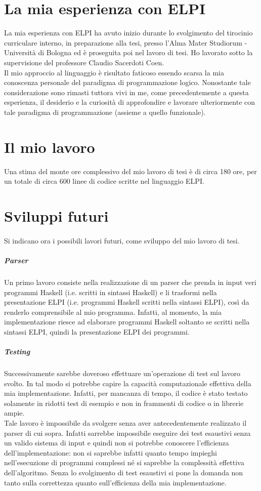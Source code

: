 \documentclass[12pt,a4paper,openright,twoside]{report}
\begin{document}
\section{La mia esperienza con ELPI}
La mia esperienza con ELPI ha avuto inizio durante lo svolgimento del tirocinio curriculare interno, in preparazione alla tesi, presso l'Alma Mater Studiorum - Università di Bologna ed è proseguita poi nel lavoro di tesi. Ho lavorato sotto la supervisione del professore Claudio Sacerdoti Coen.\\
Il mio approccio al linguaggio è risultato faticoso essendo scarsa la mia conoscenza personale del paradigma di programmazione logico. Nonostante tale considerazione sono rimasti tuttora vivi in me, come precedentemente a questa esperienza, il desiderio e la curiosità di approfondire e lavorare ulteriormente con tale paradigma di programmazione (assieme a quello funzionale).

\section{Il mio lavoro}
Una stima del monte ore complessivo del mio lavoro di tesi è di circa 180 ore, per un totale di circa 600 linee di codice scritte nel linguaggio ELPI.

\section{Sviluppi futuri}

\paragraph{}
Si indicano ora i possibili lavori futuri, come sviluppo del mio lavoro di tesi.

\subparagraph{Parser}
Un primo lavoro consiste nella realizzazione di un parser che prenda in input veri programmi Haskell (i.e. scritti in sintassi Haskell) e li trasformi nella presentazione ELPI (i.e. programmi Haskell scritti nella sintassi ELPI), così da renderlo comprensibile al mio programma. Infatti, al momento, la mia implementazione riesce ad elaborare programmi Haskell soltanto se scritti nella sintassi ELPI, quindi la presentazione ELPI dei programmi.

\subparagraph{Testing}
Successivamente sarebbe doveroso effettuare un'operazione di test sul lavoro svolto. In tal modo si potrebbe capire la capacità computazionale effettiva della mia implementazione. Infatti, per mancanza di tempo, il codice è stato testato solamente in ridotti test di esempio e non in frammenti di codice o in librerie ampie.\\
Tale lavoro è impossibile da svolgere senza aver antecedentemente realizzato il parser di cui sopra. Infatti sarrebbe impossibile eseguire dei test esaustivi senza un valido sistema di input e quindi non si potrebbe conoscere l'efficienza dell'implementazione: non si saprebbe infatti quanto tempo impieghi nell'esecuzione di programmi complessi né si saprebbe la complessità effettiva dell'algoritmo. Senza lo svolgimento di test esaustivi si pone la domanda non tanto sulla correttezza quanto sull'efficienza della mia implementazione.
\end{document}
